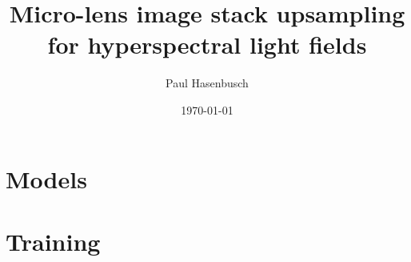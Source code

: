 \documentclass{article}
\title{Micro-lens image stack upsampling for hyperspectral light fields}
\author{Paul Hasenbusch}
\date{\today}
\begin{document}
\maketitle

\tableofcontents

\newpage

\section{Models}


\newpage

\section{Training}


\newpage



\end{document}
